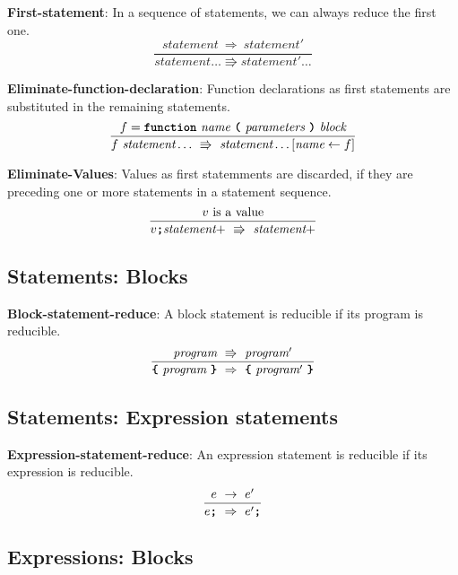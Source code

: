 \textbf{First-statement}: In a sequence of statements, we can always
reduce the first one.
\[
\frac{
  \textit{statement}\ \Rightarrow\ \textit{statement}'
}{  
  \textit{statement} \ldots
  \Rrightarrow 
  \textit{statement}' \ldots
}
\]

\vspace{10mm}

\textbf{Eliminate-function-declaration}: Function declarations as first
statements are substituted in the remaining statements.
\[
\frac{
             f = \textbf{\texttt{function}}\  \textit{name} \ 
                 \textbf{\texttt{(}}\  \textit{parameters}
                 \ \textbf{\texttt{)}}\ \textit{block}
}{
f\ \textit{statement} \ldots\ 
  \Rrightarrow\ 
  \textit{statement} \ldots[\textit{name} \leftarrow f]
}
\]

\vspace{10mm}
\textbf{Eliminate-Values}: Values as first statemments are discarded, if
they are preceding one or more statements in a statement sequence.
\[
\frac{
v \ \mbox{is a value}  
}{
v \textbf{\texttt{;}} \textit{statement}+\ 
   \Rrightarrow  \ 
  \textit{statement}+
}
\]

\subsection*{Statements: Blocks}

\textbf{Block-statement-reduce}: A block statement is
reducible if its program is reducible.
\[
\frac{
  \textit{program} 
\ \Rrightarrow \ 
  \textit{program}'
}{  
  \textbf{\texttt{\{}} \
  \textit{program} \ 
  \textbf{\texttt{\}}}
\  \Rightarrow \ 
  \textbf{\texttt{\{}} \
  \textit{program}' \ 
  \textbf{\texttt{\}}}
}
\]

\subsection*{Statements: Expression statements}

\textbf{Expression-statement-reduce}: An expression statement
is reducible if its expression is reducible.
\[
\frac{
  e\ \rightarrow\ e'
}{  
  e \textbf{\texttt{;}}
  \ \Rightarrow \ 
  e' \textbf{\texttt{;}}
}
\]


\subsection*{Expressions: Blocks}

